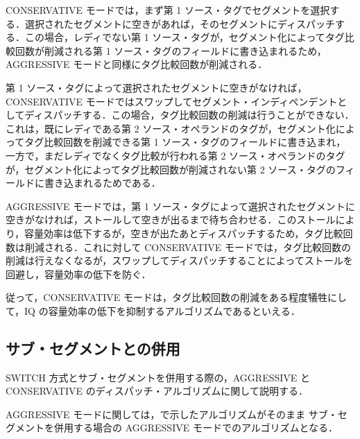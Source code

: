 CONSERVATIVE モードでは，まず第 1 ソース・タグでセグメントを選択する．選択されたセグメントに空きがあれば，そのセグメントにディスパッチする．この場合，レディでない第 1 ソース・タグが，セグメント化によってタグ比較回数が削減される第 1 ソース・タグのフィールドに書き込まれるため，AGGRESSIVE モードと同様にタグ比較回数が削減される．

第 1 ソース・タグによって選択されたセグメントに空きがなければ，CONSERVATIVE モードではスワップしてセグメント・インディペンデントとしてディスパッチする．この場合，タグ比較回数の削減は行うことができない．これは，既にレディである第 2 ソース・オペランドのタグが，セグメント化によってタグ比較回数を削減できる第 1 ソース・タグのフィールドに書き込まれ，一方で，まだレディでなくタグ比較が行われる第 2 ソース・オペランドのタグが，セグメント化によってタグ比較回数が削減されない第 2 ソース・タグのフィールドに書き込まれるためである．

AGGRESSIVE モードでは，第 1 ソース・タグによって選択されたセグメントに空きがなければ，ストールして空きが出るまで待ち合わせる．このストールにより，容量効率は低下するが，空きが出たあとディスパッチするため，タグ比較回数は削減される．これに対して CONSERVATIVE モードでは，タグ比較回数の削減は行えなくなるが，スワップしてディスパッチすることによってストールを回避し，容量効率の低下を防ぐ．

従って，CONSERVATIVE モードは，タグ比較回数の削減をある程度犠牲にして，IQ の容量効率の低下を抑制するアルゴリズムであるといえる．

\subsection{サブ・セグメントとの併用}
SWITCH 方式とサブ・セグメントを併用する際の，AGGRESSIVE と CONSERVATIVE のディスパッチ・アルゴリズムに関して説明する．

AGGRESSIVE モードに関しては，で示したアルゴリズムがそのまま サブ・セグメントを併用する場合の AGGRESSIVE モードでのアルゴリズムとなる．

